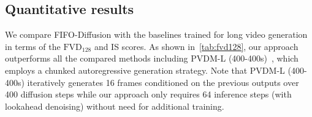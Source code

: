 \vspace{4mm}
\subsection{Quantitative results}
\label{subsec:auto_eval}


We compare FIFO-Diffusion with the baselines trained for long video generation~\citep{skorokhodov2022styleganv,mei2022vidm,yu2023pvdm} in terms of the $\text{FVD}_{128}$ and IS scores.
As shown in~\cref{tab:fvd128}, our approach outperforms all the compared methods including PVDM-L (400-400s)~\citep{yu2023pvdm}, which employs a chunked autoregressive generation strategy.
Note that PVDM-L (400-400s) iteratively generates 16 frames conditioned on the previous outputs over 400 diffusion steps while our approach only requires 64 inference steps (with lookahead denoising) without need for additional training.

\begin{table}[t]
    \centering
    \caption{Memory usages and inference times of long video generation methods. FIFO-Diffusion utilizes latent partitioning with $n=4$ and lookahead denoising.}
    \vspace{2mm}
    \label{tab:memory_time}
    \renewcommand{\arraystretch}{1.0}
    \setlength{\tabcolsep}{2.5mm}
\end{table}


